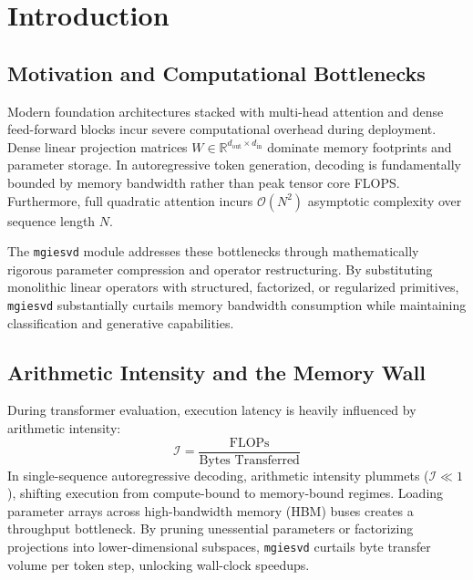 \section{Introduction}

\subsection{Motivation and Computational Bottlenecks}
Modern foundation architectures stacked with multi-head attention and dense feed-forward blocks incur severe computational overhead during deployment. Dense linear projection matrices $W \in \mathbb{R}^{d_{\text{out}} \times d_{\text{in}}}$ dominate memory footprints and parameter storage. In autoregressive token generation, decoding is fundamentally bounded by memory bandwidth rather than peak tensor core FLOPS. Furthermore, full quadratic attention incurs $\mathcal{O}(N^2)$ asymptotic complexity over sequence length $N$.

The \texttt{mgiesvd} module addresses these bottlenecks through mathematically rigorous parameter compression and operator restructuring. By substituting monolithic linear operators with structured, factorized, or regularized primitives, \texttt{mgiesvd} substantially curtails memory bandwidth consumption while maintaining classification and generative capabilities.

\subsection{Arithmetic Intensity and the Memory Wall}
During transformer evaluation, execution latency is heavily influenced by arithmetic intensity:
\[
\mathcal{I} = \frac{\text{FLOPs}}{\text{Bytes Transferred}}
\]
In single-sequence autoregressive decoding, arithmetic intensity plummets ($\mathcal{I} \ll 1$), shifting execution from compute-bound to memory-bound regimes. Loading parameter arrays across high-bandwidth memory (HBM) buses creates a throughput bottleneck. By pruning unessential parameters or factorizing projections into lower-dimensional subspaces, \texttt{mgiesvd} curtails byte transfer volume per token step, unlocking wall-clock speedups.

